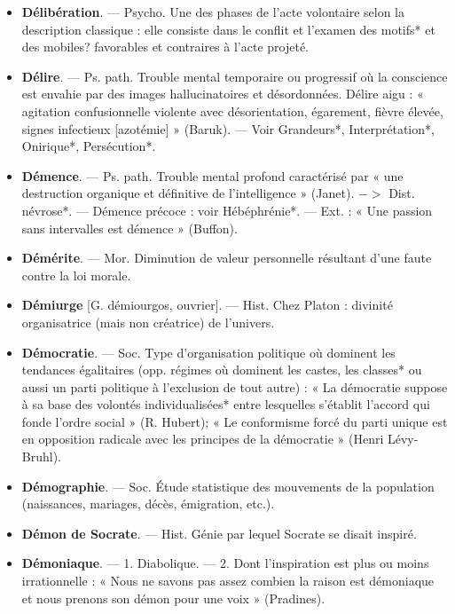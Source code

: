 \begin{itemize}[leftmargin=1cm, label=, itemsep=1pt]
\item {\bf Délibération}. — Psycho. Une des
phases de l’acte volontaire selon la
description classique : elle consiste 
dans le conflit et l'examen des motifs* et des mobiles? favorables et
contraires à l’acte projeté.

\item {\bf Délire}. — Ps. path. Trouble mental
temporaire ou progressif où la conscience est envahie par des images
hallucinatoires et désordonnées. Délire aigu : « agitation confusionnelle
violente avec désorientation, égarement, fièvre élevée, signes infectieux [azotémie] » (Baruk). — Voir
Grandeurs*, Interprétation*, Onirique*, Persécution*.

\item {\bf Démence}. — Ps. path. Trouble mental
profond caractérisé par « une destruction organique et définitive de
l'intelligence » (Janet). $->$ Dist.
névrose*. — Démence précoce : voir
Hébéphrénie*. — Ext. : « Une passion sans intervalles est démence »
(Buffon).

\item {\bf Démérite}. — Mor. Diminution de
valeur personnelle résultant d’une
faute contre la loi morale.

\item {\bf Démiurge} [G. démiourgos, ouvrier].
— Hist. Chez Platon : divinité organisatrice (mais non créatrice) de
l'univers.

\item {\bf Démocratie}. — Soc. Type d’organisation politique où dominent les
tendances égalitaires (opp. régimes
où dominent les castes, les classes*
ou aussi un parti politique à l'exclusion de tout autre) : « La démocratie suppose à sa base des volontés
individualisées* entre lesquelles
s'établit l'accord qui fonde l’ordre
social » (R. Hubert); « Le conformisme forcé du parti unique est
en opposition radicale avec les principes de la démocratie » (Henri
Lévy-Bruhl).

\item {\bf Démographie}. — Soc. Étude statistique des mouvements de la population (naissances, mariages, décès, émigration, etc.).

\item {\bf Démon de Socrate}. — Hist. Génie par
lequel Socrate se disait inspiré.

\item {\bf Démoniaque}. — 1. Diabolique. — 2.
Dont l'inspiration est plus ou moins
irrationnelle : « Nous ne savons pas
assez combien la raison est démoniaque et nous prenons son démon
pour une voix » (Pradines).


\end{itemize}
